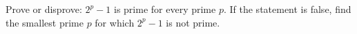Prove or disprove: $2^p-1$ is prime for every prime $p$. If the statement is false, find the smallest prime $p$ for which $2^p-1$ is not prime.
